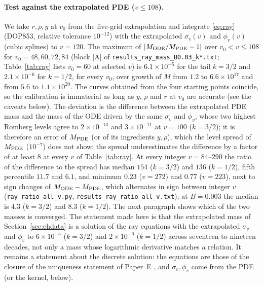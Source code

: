 \documentclass[11pt]{article}
\begin{document}
\paragraph{Test against the extrapolated PDE ($v\le108$).} We take $r,\rho,y$ at $v_0$ from the five-grid extrapolation and integrate \eqref{eq:ray} (DOP853, relative tolerance $10^{-12}$) with the extrapolated $\sigma_v(v)$ and $\phi_v(v)$ (cubic splines) to $v=120$. The maximum of $|M_{\rm ODE}/M_{\rm PDE}-1|$ over $v_0<v\le108$ for $v_0=48,60,72,84$ (block [A] of \texttt{results\_ray\_mass\_B0.03\_k*.txt}; Table~\ref{tab:ray} lists $v_0=60$ at selected $v$) is $6.1\times10^{-5}$ for the tail $k=3/2$ and $2.1\times10^{-6}$ for $k=1/2$, for every $v_0$, over growth of $M$ from $1.2$ to $6.6\times10^{17}$ and from $5.6$ to $1.1\times10^{20}$. The curves obtained from the four starting points coincide, so the calibration is immaterial as long as $y$, $\rho$ and $r$ at $v_0$ are accurate (see the caveats below). The deviation is the difference between the extrapolated PDE mass and the mass of the ODE driven by the same $\sigma_v$ and $\phi_v$, whose two highest Romberg levels agree to $2\times10^{-13}$ and $3\times10^{-11}$ at $v=100$ ($k=3/2$); it is therefore an error of $M_{\rm PDE}$ (or of its ingredients $y,\rho$), which the level spread of $M_{\rm PDE}$ ($10^{-7}$) does not show: the spread underestimates the difference by a factor of at least $8$ at every $v$ of Table~\ref{tab:ray}. At every integer $v=84$--$290$ the ratio of the difference to the spread has median $154$ ($k=3/2$) and $136$ ($k=1/2$), fifth percentile $11.7$ and $6.1$, and minimum $0.23$ ($v=272$) and $0.77$ ($v=223$), next to sign changes of $M_{\rm ODE}-M_{\rm PDE}$, which alternates in sign between integer $v$ (\texttt{ray\_ratio\_all\_v.py}, \texttt{results\_ray\_ratio\_all\_v.txt}); at $B=0.003$ the median is $4.3$ ($k=3/2$) and $8.3$ ($k=1/2$). The next paragraph shows which of the two masses is converged. The statement made here is that the extrapolated mass of Section~\ref{sec:ehdata} is a solution of the ray equations with the extrapolated $\sigma_v$ and $\phi_v$ to $6\times10^{-5}$ ($k=3/2$) and $2\times10^{-6}$ ($k=1/2$) across seventeen to nineteen decades, not only a mass whose logarithmic derivative matches a relation. It remains a statement about the discrete solution: the equations are those of the closure of the uniqueness statement of Paper~E \citep{PaperE}, and $\sigma_v,\phi_v$ come from the PDE (or the kernel, below).
\end{document}
